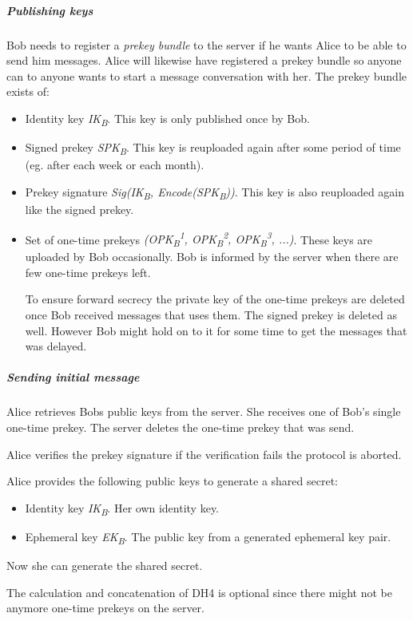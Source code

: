\subparagraph{Publishing keys}
Bob needs to register a \emph{prekey bundle} to the server if he wants Alice to be able to send him messages. Alice will likewise have registered a prekey bundle so anyone can to anyone wants to start a message conversation with her.  
The prekey bundle exists of:

\begin{itemize}
	\item Identity key \emph{IK\textsubscript{B}}. This key is only published once by Bob.
	\item Signed prekey \emph{SPK\textsubscript{B}}. This key is reuploaded again after some period of time (eg. after each week or each month). 
	\item Prekey signature \emph{Sig(IK\textsubscript{B}, Encode(SPK\textsubscript{B}))}. This key is also reuploaded again like the signed prekey.
	\item Set of one-time prekeys \emph{(OPK\textsubscript{B}\textsuperscript{1}, OPK\textsubscript{B}\textsuperscript{2}, OPK\textsubscript{B}\textsuperscript{3}, ...)}. These keys are uploaded by Bob occasionally. Bob is informed by the server when there are few one-time prekeys left. 
	
	To ensure forward secrecy the private key of the one-time prekeys are deleted once Bob received messages that uses them. The signed prekey is deleted as well. However Bob might hold on to it for some time to get the messages that was delayed.  
\end{itemize}

\subparagraph{Sending initial message}
Alice retrieves Bobs public keys from the server. She receives one of Bob's single one-time prekey. The server deletes the one-time prekey that was send.   


Alice verifies the prekey signature if the verification fails the protocol is aborted. 

Alice provides the following public keys to generate a shared secret:

\begin{itemize}
	\item Identity key \emph{IK\textsubscript{B}}. Her own identity key. 
	\item Ephemeral key \emph{EK\textsubscript{B}}. The public key from a generated ephemeral key pair.
\end{itemize}


Now she can generate the shared secret.

The calculation and concatenation of DH4 is optional since there might not be anymore one-time prekeys on the server. 

